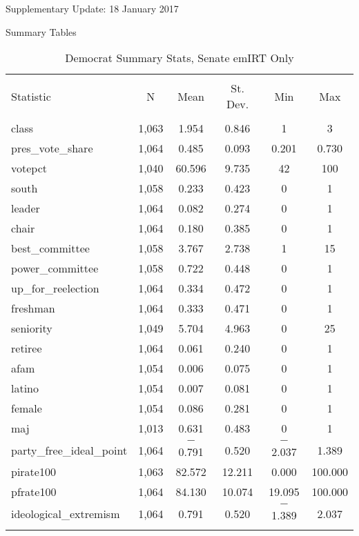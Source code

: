 \documentclass[12pt]{article}
\begin{document}
	

\begin{center}
	Supplementary Update: 18 January 2017
	
	Summary Tables
\end{center}



\begin{table}[!htbp] \centering 
	\caption{Democrat Summary Stats, Senate emIRT Only} 
	\label{} 
	\begin{tabular}{@{\extracolsep{5pt}}lccccc} 
		\\[-1.8ex]\hline 
		\hline \\[-1.8ex] 
		Statistic & \multicolumn{1}{c}{N} & \multicolumn{1}{c}{Mean} & \multicolumn{1}{c}{St. Dev.} & \multicolumn{1}{c}{Min} & \multicolumn{1}{c}{Max} \\ 
		\hline \\[-1.8ex] 
		class & 1,063 & 1.954 & 0.846 & 1 & 3 \\ 
		pres\_vote\_share & 1,064 & 0.485 & 0.093 & 0.201 & 0.730 \\ 
		votepct & 1,040 & 60.596 & 9.735 & 42 & 100 \\ 
		south & 1,058 & 0.233 & 0.423 & 0 & 1 \\ 
		leader & 1,064 & 0.082 & 0.274 & 0 & 1 \\ 
		chair & 1,064 & 0.180 & 0.385 & 0 & 1 \\ 
		best\_committee & 1,058 & 3.767 & 2.738 & 1 & 15 \\ 
		power\_committee & 1,058 & 0.722 & 0.448 & 0 & 1 \\ 
		up\_for\_reelection & 1,064 & 0.334 & 0.472 & 0 & 1 \\ 
		freshman & 1,064 & 0.333 & 0.471 & 0 & 1 \\ 
		seniority & 1,049 & 5.704 & 4.963 & 0 & 25 \\ 
		retiree & 1,064 & 0.061 & 0.240 & 0 & 1 \\ 
		afam & 1,054 & 0.006 & 0.075 & 0 & 1 \\ 
		latino & 1,054 & 0.007 & 0.081 & 0 & 1 \\ 
		female & 1,054 & 0.086 & 0.281 & 0 & 1 \\ 
		maj & 1,013 & 0.631 & 0.483 & 0 & 1 \\ 
		party\_free\_ideal\_point & 1,064 & $-$0.791 & 0.520 & $-$2.037 & 1.389 \\ 
		pirate100 & 1,063 & 82.572 & 12.211 & 0.000 & 100.000 \\ 
		pfrate100 & 1,064 & 84.130 & 10.074 & 19.095 & 100.000 \\ 
		ideological\_extremism & 1,064 & 0.791 & 0.520 & $-$1.389 & 2.037 \\ 
		\hline \\[-1.8ex] 
	\end{tabular} 
\end{table}
\end{document}
